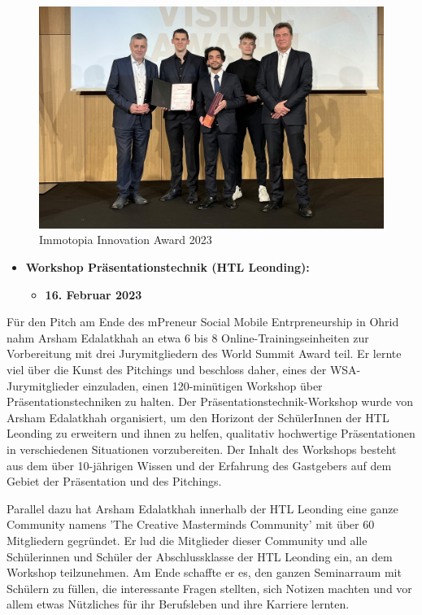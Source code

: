 \begin{figure}[H]
    \centering
    \includegraphics[width=1\textwidth]{pics/Immotopia-2023.jpg}
    \caption{Immotopia Innovation Award 2023}
    \label{fig:Immotopia2023}
\end{figure}

\begin{itemize}
    \item \textbf{Workshop Präsentationstechnik (HTL Leonding):}
          \begin{itemize}
              \item \textbf{16. Februar 2023}
          \end{itemize}
\end{itemize}


Für den Pitch am Ende des mPreneur Social Mobile Entrpreneurship in Ohrid nahm Arsham Edalatkhah an etwa 6 bis 8 Online-Trainingseinheiten zur Vorbereitung mit drei Jurymitgliedern des World Summit Award teil. Er lernte viel über die Kunst des Pitchings und beschloss daher, eines der WSA-Jurymitglieder einzuladen, einen 120-minütigen Workshop über Präsentationstechniken zu halten. Der Präsentationstechnik-Workshop wurde von Arsham Edalatkhah organisiert, um den Horizont der SchülerInnen der HTL Leonding zu erweitern und ihnen zu helfen, qualitativ hochwertige Präsentationen in verschiedenen Situationen vorzubereiten. Der Inhalt des Workshops besteht aus dem über 10-jährigen Wissen und der Erfahrung des Gastgebers auf dem Gebiet der Präsentation und des Pitchings.

Parallel dazu hat Arsham Edalatkhah innerhalb der HTL Leonding eine ganze Community namens 'The Creative Masterminds Community' mit über 60 Mitgliedern gegründet. Er lud die Mitglieder dieser Community und alle Schülerinnen und Schüler der Abschlussklasse der HTL Leonding ein, an dem Workshop teilzunehmen. Am Ende schaffte er es, den ganzen Seminarraum mit Schülern zu füllen, die interessante Fragen stellten, sich Notizen machten und vor allem etwas Nützliches für ihr Berufsleben und ihre Karriere lernten.

